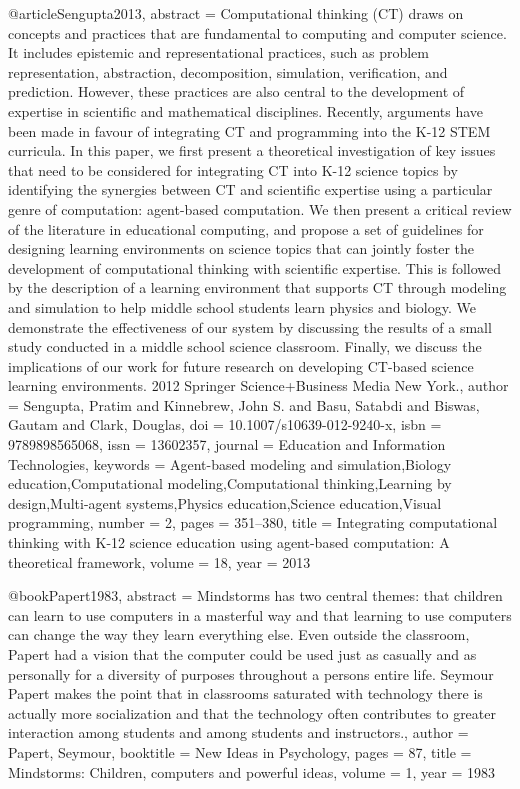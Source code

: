 @article{Sengupta2013,
abstract = {Computational thinking (CT) draws on concepts and practices that are fundamental to computing and computer science. It includes epistemic and representational practices, such as problem representation, abstraction, decomposition, simulation, verification, and prediction. However, these practices are also central to the development of expertise in scientific and mathematical disciplines. Recently, arguments have been made in favour of integrating CT and programming into the K-12 STEM curricula. In this paper, we first present a theoretical investigation of key issues that need to be considered for integrating CT into K-12 science topics by identifying the synergies between CT and scientific expertise using a particular genre of computation: agent-based computation. We then present a critical review of the literature in educational computing, and propose a set of guidelines for designing learning environments on science topics that can jointly foster the development of computational thinking with scientific expertise. This is followed by the description of a learning environment that supports CT through modeling and simulation to help middle school students learn physics and biology. We demonstrate the effectiveness of our system by discussing the results of a small study conducted in a middle school science classroom. Finally, we discuss the implications of our work for future research on developing CT-based science learning environments. {\textcopyright} 2012 Springer Science+Business Media New York.},
author = {Sengupta, Pratim and Kinnebrew, John S. and Basu, Satabdi and Biswas, Gautam and Clark, Douglas},
doi = {10.1007/s10639-012-9240-x},
isbn = {9789898565068},
issn = {13602357},
journal = {Education and Information Technologies},
keywords = {Agent-based modeling and simulation,Biology education,Computational modeling,Computational thinking,Learning by design,Multi-agent systems,Physics education,Science education,Visual programming},
number = {2},
pages = {351--380},
title = {{Integrating computational thinking with K-12 science education using agent-based computation: A theoretical framework}},
volume = {18},
year = {2013}
}


@book{Papert1983,
	abstract = {Mindstorms has two central themes: that children can learn to use computers in a masterful way and that learning to use computers can change the way they learn everything else. Even outside the classroom, Papert had a vision that the computer could be used just as casually and as personally for a diversity of purposes throughout a persons entire life. Seymour Papert makes the point that in classrooms saturated with technology there is actually more socialization and that the technology often contributes to greater interaction among students and among students and instructors.},
	author = {Papert, Seymour},
	booktitle = {New Ideas in Psychology},
	pages = {87},
	title = {{Mindstorms: Children, computers and powerful ideas}},
	volume = {1},
	year = {1983}
}

